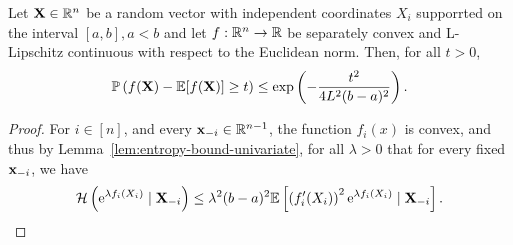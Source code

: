\begin{theorem}
	\label{thm:tail-bound-lipschitz}
	Let \({\bf X}\in{\mathbb R}^{n}\) be a random vector with independent coordinates \(X_{i}\) supporrted on the interval \([a,b], a<b\) and let \(f:{\mathbb R}^{n}\to{\mathbb R}\) be separately convex and L-Lipschitz continuous with respect to the Euclidean norm. Then, for all \(t>0\),
	\begin{equation}
		{\mathbb P}\left(f({\bf X})-{\mathbb E}[f({\bf X})]\geq t\right)\leq\exp\left(-\frac{t^2}{4L^2(b-a)^2}\right).
	\end{equation}
\end{theorem}

\begin{proof}
	For $i\in[n]$, and every ${\bf x}_{-i}\in{\mathbb R}^{n-1}$, the function $f_{i}(x)$ is convex, and thus by Lemma~\ref{lem:entropy-bound-univariate}, for all $\lambda>0$ that for every fixed ${\bf x}_{-i}$, we have
	\begin{equation*}
		{\mathcal H}\left(\mathrm{e}^{\lambda f_{i}(X_{i})}\mid{\bf X}_{-i}\right)\leq\lambda^2(b-a)^2{\mathbb E}\left[\left(f_{i}^{\prime}(X_{i})\right)^2\mathrm{e}^{\lambda f_{i}(X_{i})}\mid{\bf X}_{-i}\right].
	\end{equation*}

\end{proof}

